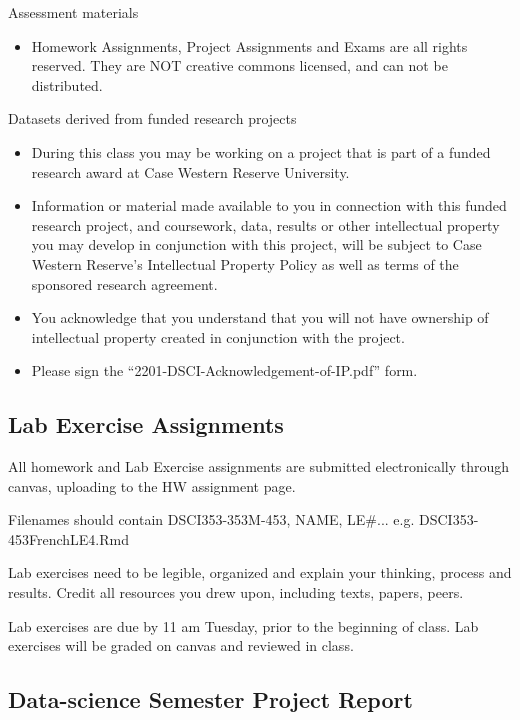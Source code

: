 \documentclass[10pt]{article} %
\begin{document}
    Assessment materials
    \begin{itemize}
      \item Homework Assignments, Project Assignments and Exams are all rights reserved.
      \subitem They are NOT creative commons licensed, and can not be distributed.
    \end{itemize}

    Datasets derived from funded research projects
    \begin{itemize}
      \item During this class you may be working on a project that is part of a funded research award at Case Western Reserve University.
      \item Information or material made available to you in connection with this funded research project, and coursework, data, results or other intellectual property you may develop in conjunction with this project, will be subject to Case Western Reserve’s Intellectual Property Policy as well as terms of the sponsored research agreement.
      \item You acknowledge that you understand that you will not have ownership of intellectual property created in conjunction with the project.
      \item Please sign the ``2201-DSCI-Acknowledgement-of-IP.pdf'' form.
    \end{itemize}

  \subsection{Lab Exercise Assignments}
    All homework and Lab Exercise assignments are submitted electronically through canvas, uploading to the HW assignment page.

    Filenames should contain DSCI353-353M-453, NAME, LE\#... e.g. DSCI353-453FrenchLE4.Rmd

    Lab exercises need to be legible, organized and explain your thinking, process and results.
    Credit all resources you drew upon, including texts, papers, peers.

    Lab exercises are due by 11 am Tuesday, prior to the beginning of class.
    Lab exercises will be graded on canvas and reviewed in class.


  \subsection{Data-science Semester Project Report}
\end{document}
